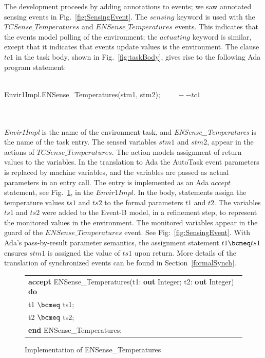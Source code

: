 The development proceeds by adding annotations to events; we saw annotated sensing events in Fig.~\ref{fig:SensingEvent}. The $sensing$ keyword is used with the $TCSense\_Temperatures$ and $ENSense\_Temperatures$ events. This indicates that the events model polling of the environment; the $actuating$ keyword is similar, except that it indicates that events update values is the environment. The clause $tc1$ in the task body, shown in Fig.~\ref{fig:taskBody}, gives rise to the following Ada program statement:
\\\\
\begin{minipage}{\textwidth}
\begin{center}
\begin{sffamily}
Envir1Impl.ENSense\_Temperatures(stm1, stm2); $\qquad--tc1$
\end{sffamily}
\end{center}
\end{minipage}
\\\\
\emph{Envir1Impl} is the name of the environment task, and \emph{ENSense\_Temperatures} is the name of the task entry. The sensed variables $stm1$ and $stm2$, appear in the actions of $TCSense\_Temperatures$. The action models assignment of return values to the variables. In the translation to Ada the AutoTask event parameters is replaced by machine variables, and the variables are passed as actual parameters in an entry call. The entry is implemented as an Ada $accept$ statement, see Fig.~\ref{fig:senseTempImpl}, in the $Envir1Impl$. In the body, statements assign the temperature values $ts1$ and $ts2$ to the formal parameters $t1$ and $t2$. The variables $ts1$ and $ts2$ were added to the Event-B model, in a refinement step, to represent the monitored values in the environment. The monitored variables appear in the guard of the $ENSense\_Temperatures$ event. See Fig:~\ref{fig:SensingEvent}. With Ada's pass-by-result parameter semantics, the assignment statement $t1 \bcmeq ts1$ ensures $stm1$ is assigned the value of $ts1$ upon return. More details of the translation of synchronized events can be found in Section~\ref{formalSynch}.
%
\begin{figure}
\begin{sffamily}
\begin{minipage}{\linewidth}
\begin{center}
\begin{tabular}{l}
\textbf{accept} ENSense\_Temperatures(t1: \textbf{out} Integer; t2: \textbf{out} Integer) \textbf{do} \\
\quad t1 $\bcmeq$ ts1; \\
\quad t2 $\bcmeq$ ts2;\\
\textbf{end} ENSense\_Temperatures;
\end{tabular}
\end{center}
\end{minipage}
\end{sffamily}
	\caption{Implementation of ENSense\_Temperatures}
	\label{fig:senseTempImpl}
\end{figure}
%
